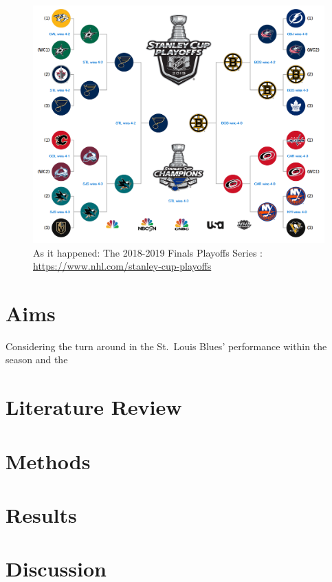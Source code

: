\documentclass[]{article}
\begin{document}
\begin{figure}
\centering
\includegraphics{Finals_2019.png}
\caption{As it happened: The 2018-2019 Finals Playoffs Series \nSource:
\url{https://www.nhl.com/stanley-cup-playoffs}}
\end{figure}

\section{Aims}\label{aims}

Considering the turn around in the St.~Louis Blues' performance within
the season and the

\section{Literature Review}\label{literature-review}

\section{Methods}\label{methods}

\section{Results}\label{results}

\section{Discussion}\label{discussion}
\end{document}
